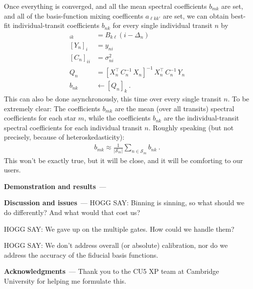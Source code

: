 \documentclass{article}
\renewcommand{\paragraph}[1]{\bigskip\par\noindent\textbf{#1}~---}
\newcommand{\set}[1]{\mathscr{#1}}
\begin{document}
Once everything is converged, and all the mean spectral coefficients $b_{mk}$ are set,
and all of the basis-function mixing coefficents $a_{\ell kk'}$ are set,
we can obtain best-fit individual-transit coefficients $b_{nk}$ for every single individual transit $n$ by
\begin{align}
    [X_n]_{ik} &= B_{k\ell}(i-\Delta_n) \\
    [Y_n]_i &= y_{ni} \\
    [C_n]_{ii} &= \sigma^2_{ni} \\
    Q_n &= [X_n^\top\,C^{-1}_n\,X_n]^{-1}\,X_n^\top\,C^{-1}_n\,Y_n \\
    b_{nk} &\leftarrow [Q_n]_{k} ~.
\end{align}
This can also be done asynchronously, this time over every single transit $n$.
To be extremely clear: The coefficients $b_{mk}$ are the mean (over all transits) spectral coefficients for each star $m$,
while the coefficients $b_{nk}$ are the individual-transit spectral coefficients for each individual transit $n$.
Roughly speaking (but not precisely, because of heteroskedasticity):
\begin{align}
    b_{mk} \approx \frac{1}{|\set{S}_m|}\sum_{n\in\set{S}_m} b_{nk} ~.
\end{align}
This won't be exactly true, but it will be close, and it will be comforting to our users.

\paragraph{Demonstration and results}

\paragraph{Discussion and issues}
HOGG SAY: Binning is sinning, so what should we do differently? And what would that cost us?

HOGG SAY: We gave up on the multiple gates. How could we handle them?

HOGG SAY: We don't address overall (or absolute) calibration, nor do we address the accuracy of the fiducial basis functions.

\paragraph{Acknowledgments}
Thank you to the CU5 XP team at Cambridge University for helping me formulate this.
\end{document}
